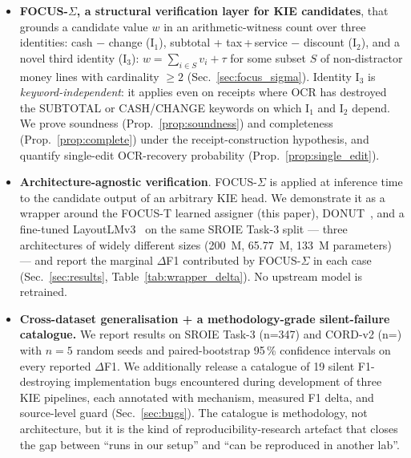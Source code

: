 \begin{itemize}
\item \textbf{FOCUS-$\Sigma$, a structural verification layer for KIE
  candidates}, that grounds a candidate value $w$ in an
  arithmetic-witness count over three identities: cash − change
  ($\mathrm{I}_1$), subtotal + tax\,+\,service − discount ($\mathrm{I}_2$),
  and a novel third identity ($\mathrm{I}_3$): $w = \sum_{i \in S} v_i + \tau$
  for some subset $S$ of non-distractor money lines with cardinality
  $\ge 2$ (Sec.~\ref{sec:focus_sigma}).  Identity $\mathrm{I}_3$ is
  \emph{keyword-independent}: it applies even on receipts where OCR
  has destroyed the \textsf{SUBTOTAL} or \textsf{CASH/CHANGE} keywords
  on which $\mathrm{I}_1$ and $\mathrm{I}_2$ depend.  We prove
  soundness (Prop.~\ref{prop:soundness}) and completeness
  (Prop.~\ref{prop:complete}) under the receipt-construction
  hypothesis, and quantify single-edit OCR-recovery probability
  (Prop.~\ref{prop:single_edit}).
\item \textbf{Architecture-agnostic verification}.  FOCUS-$\Sigma$ is
  applied at inference time to the candidate output of an arbitrary
  KIE head.  We demonstrate it as a wrapper around the FOCUS-T
  learned assigner (this paper), DONUT~\cite{kim2022donut}, and a
  fine-tuned LayoutLMv3~\cite{huang2022layoutlmv3} on the same
  SROIE Task-3 split — three architectures of widely different sizes
  (200~M, 65.77~M, 133~M parameters) — and report the marginal
  $\Delta$F1 contributed by FOCUS-$\Sigma$ in each case
  (Sec.~\ref{sec:results}, Table~\ref{tab:wrapper_delta}).  No upstream
  model is retrained.
\item \textbf{Cross-dataset generalisation + a methodology-grade
  silent-failure catalogue.}  We report results on SROIE Task-3 (n=347)
  and CORD-v2 (n=) with $n=5$ random seeds and
  paired-bootstrap 95\,\% confidence intervals on every reported
  $\Delta$F1.  We additionally release a catalogue of 19 silent
  F1-destroying implementation bugs encountered during development of
  three KIE pipelines, each annotated with mechanism, measured F1
  delta, and source-level guard (Sec.~\ref{sec:bugs}).  The catalogue
  is methodology, not architecture, but it is the kind of
  reproducibility-research artefact that closes the gap between
  ``runs in our setup'' and ``can be reproduced in another lab''.
\end{itemize}

